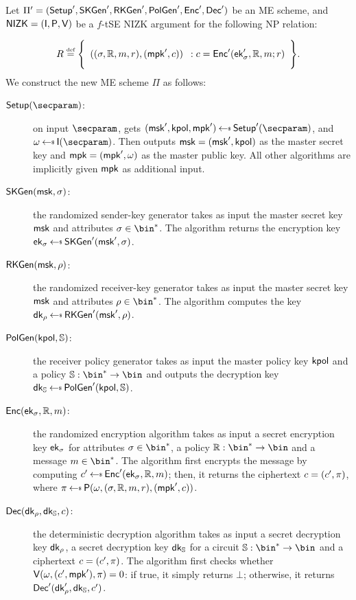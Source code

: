 \begin{construction}\label{constr:me_nizk_priv}
    Let $\Pi'=(\mathsf{Setup}',\mathsf{SKGen}',\mathsf{RKGen}', \mathsf{PolGen}', \mathsf{Enc}',\mathsf{Dec}')$ be an ME scheme, and $\mathsf{NIZK}=(\mathsf{I},\mathsf{P},\mathsf{V})$ be a $f$-tSE NIZK argument for the following NP relation:

    \[
        R \eqdef \Biggl\{ \begin{array}{c}((\sattr, \raccess, \msg, r),(\mpk',\cipher))\end{array}:\begin{array}{@{}c}
            \cipher = \enc'(\ek'_\sattr, \raccess, \msg; r)
        \end{array} \Biggr\}.
    \]
    \newline\newline
    We construct the new ME scheme $\Pi$ as follows:
    \begin{description}
        \item[$\setup(\secparam)$:] on input $\secparam$, gets $(\msk', \kpol, \mpk') \getsr \setup'(\secparam)$, and $\crs \getsr \init(\secparam)$. Then outputs $\mathsf{msk} = (\mathsf{msk}', \mathsf{kpol})$ as the master secret key and $\mathsf{mpk} = (\mathsf{mpk}', \omega)$ as the master public key. All other algorithms are implicitly given $\mathsf{mpk}$ as additional input.
        \item[$\mathsf{SKGen}(\mathsf{msk}, \sigma)$:] the randomized sender-key generator takes as input the master secret key $\mathsf{msk}$ and attributes $\sattr \in \bin^*$. The algorithm returns the encryption key $\ek_\sattr \getsr \skgen'(\msk', \sattr)$.
        \item[$\mathsf{RKGen}(\mathsf{msk}, \rho)$:] the randomized receiver-key generator takes as input the master secret key $\mathsf{msk}$ and attributes $\rattr \in \bin^*$. The algorithm computes the key $\dk_\rattr \getsr \rkgen'(\msk', \rattr)$.
        \item[$\mathsf{PolGen}(\mathsf{kpol}, \mathbb{S})$:] the receiver policy generator takes as input the master policy key $\mathsf{kpol}$ and a policy $\saccess: \bin^* \to \bin$ and outputs the decryption key $\dk_\saccess \getsr \polgen'(\kpol, \saccess)$.
        \item[$\mathsf{Enc}(\mathsf{ek}_\sigma, \mathbb{R}, m)$:] the randomized encryption algorithm takes as input a secret encryption key $\mathsf{ek}_\sigma$ for attributes $\sattr \in \bin^*$, a policy $\raccess: \bin^* \to \bin$ and a message $\msg \in \bin^*$. The algorithm first encrypts the message by computing $\cipher' \getsr \enc'(\ek_\sattr, \raccess, \msg)$; then, it returns the ciphertext $c = (c', \pi)$, where $\pi \getsr \prover(\crs, (\sattr, \raccess, \msg, r),(\mpk', \cipher))$.
        \item[$\mathsf{Dec}(\mathsf{dk}_\rho, \mathsf{dk}_{\mathbb{S}}, c)$:] the deterministic decryption algorithm takes as input a secret decryption key $\mathsf{dk}_\rho$, a secret decryption key $\mathsf{dk}_{\mathbb{S}}$ for a circuit $\saccess: \bin^* \to \bin$ and a ciphertext $c = (c', \pi)$. The algorithm first checks whether $\mathsf{V}(\omega, (c', \mathsf{mpk}'), \pi) = 0$: if true, it simply returns $\bot$; otherwise, it returns $\mathsf{Dec}'(\mathsf{dk}'_\rho, \mathsf{dk}_{\mathbb{S}}, c')$.
    \end{description}
\end{construction}